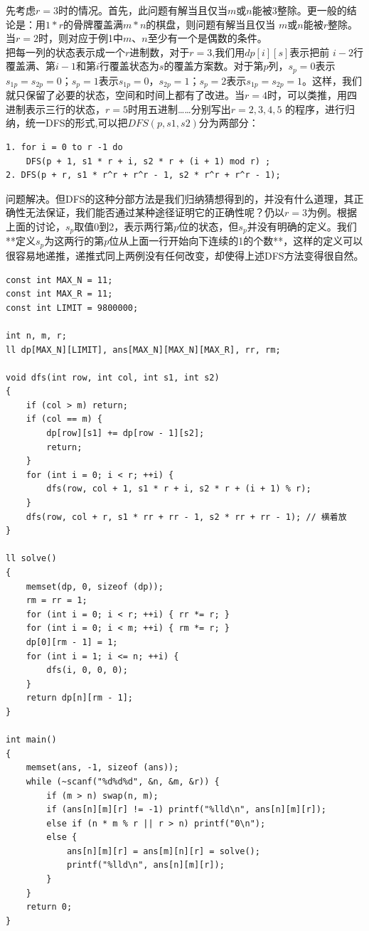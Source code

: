 先考虑$r=3$时的情况。首先，此问题有解当且仅当$m$或$n$能被$3$整除。更一般的结论是：用$1*r$的骨牌覆盖满$m*n$的棋盘，则问题有解当且仅当 $m$或$n$能被$r$整除。当$r=2$时，则对应于例1中$m、n$至少有一个是偶数的条件。 \\
把每一列的状态表示成一个$r$进制数，对于$r=3$,我们用$dp[i][s]$表示把前 $i-2$行覆盖满、第$i-1$和第$i$行覆盖状态为$s$的覆盖方案数。对于第$p$列，$s_p=0$表示$s_{1p}=s_{2p}=0$；$s_{p}=1$表示$s_{1p}=0，s_{2p}=1$；$s_{p} = 2 $表示$s_{1p}=s_{2p}=1$。这样，我们就只保留了必要的状态，空间和时间上都有了改进。当$r= 4$时，可以类推，用四进制表示三行的状态，$r=5$时用五进制……分别写出$r= 2,3,4,5$ 的程序，进行归纳，统一DFS的形式,可以把$DFS(p,s1,s2)$分为两部分：
\begin{lstlisting}
1. for i = 0 to r -1 do
    DFS(p + 1, s1 * r + i, s2 * r + (i + 1) mod r) ;
2. DFS(p + r, s1 * r^r + r^r - 1, s2 * r^r + r^r - 1);
\end{lstlisting}
问题解决。但DFS的这种分部方法是我们归纳猜想得到的，并没有什么道理，其正确性无法保证，我们能否通过某种途径证明它的正确性呢？仍以$r=3$为例。根据上面的讨论，$s_p$取值0到2，表示两行第$p$位的状态，但$s_p$并没有明确的定义。我们**定义$s_p$为这两行的第$p$位从上面一行开始向下连续的1的个数**，这样的定义可以很容易地递推，递推式同上两例没有任何改变，却使得上述DFS方法变得很自然。
\begin{lstlisting}
const int MAX_N = 11;
const int MAX_R = 11;
const int LIMIT = 9800000;

int n, m, r;
ll dp[MAX_N][LIMIT], ans[MAX_N][MAX_N][MAX_R], rr, rm;

void dfs(int row, int col, int s1, int s2)
{
	if (col > m) return;
	if (col == m) {
		dp[row][s1] += dp[row - 1][s2];
		return;
	}
	for (int i = 0; i < r; ++i) {
		dfs(row, col + 1, s1 * r + i, s2 * r + (i + 1) % r);
	}
	dfs(row, col + r, s1 * rr + rr - 1, s2 * rr + rr - 1); // 横着放
}

ll solve()
{
	memset(dp, 0, sizeof (dp));
	rm = rr = 1;
	for (int i = 0; i < r; ++i) { rr *= r; }
	for (int i = 0; i < m; ++i) { rm *= r; }
	dp[0][rm - 1] = 1;
	for (int i = 1; i <= n; ++i) {
		dfs(i, 0, 0, 0);
	}
	return dp[n][rm - 1];
}

int main()
{
	memset(ans, -1, sizeof (ans));
	while (~scanf("%d%d%d", &n, &m, &r)) {
		if (m > n) swap(n, m);
		if (ans[n][m][r] != -1) printf("%lld\n", ans[n][m][r]);
		else if (n * m % r || r > n) printf("0\n");
		else {
			ans[n][m][r] = ans[m][n][r] = solve();
			printf("%lld\n", ans[n][m][r]);
		}
	}
	return 0;
}
\end{lstlisting}

